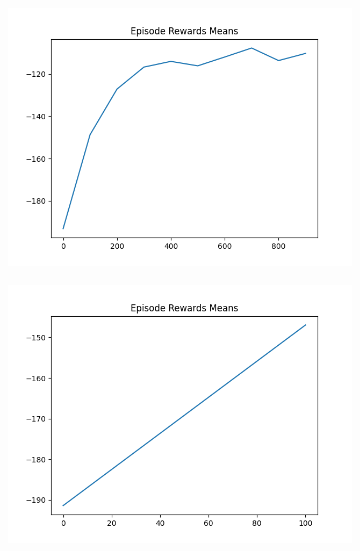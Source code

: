 \begin{figure}[H]
    \centering
    \begin{subfigure}{.47\linewidth}
        \centering
        \includegraphics[width=\textwidth]{mountain/2024-06-15_13-56-21_dqn_mountaincar_episode_rewards_means.png}
    \end{subfigure}
    \begin{subfigure}{.47\linewidth}
        \centering
        \includegraphics[width=\textwidth]{mountain/2024-06-15_13-48-51_dqn_mountaincar_episode_rewards_means.png}
    \end{subfigure}
    \begin{subfigure}{.47\linewidth}
        \centering

\end{subfigure}
\end{figure}
